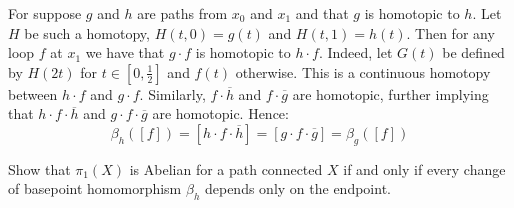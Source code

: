\documentclass{book}                                                           %
\begin{document}
        \begin{solution}
            For suppose $g$ and $h$ are paths from $x_{0}$ and $x_{1}$ and that $g$
            is homotopic to $h$. Let $H$ be such a homotopy, $H(t,0)=g(t)$ and
            $H(t,1)=h(t)$. Then for any loop $f$ at $x_{1}$ we have that $g\cdot{f}$
            is homotopic to $h\cdot{f}$. Indeed, let $G(t)$ be defined by $H(2t)$
            for $t\in[0,\frac{1}{2}]$ and $f(t)$ otherwise. This is a continuous
            homotopy between $h\cdot{f}$ and
            $g\cdot{f}$. Similarly, $f\cdot\overline{h}$ and $f\cdot\overline{g}$
            are homotopic, further implying that $h\cdot{f}\cdot\overline{h}$ and
            $g\cdot{f}\cdot\overline{g}$ are homotopic. Hence:
            \begin{equation}
                \beta_{h}([f])=[h\cdot{f}\cdot\overline{h}]
                    =[g\cdot{f}\cdot\overline{g}]=\beta_{g}([f])
            \end{equation}
        \end{solution}
        \begin{problem}
            Show that $\pi_{1}(X)$ is Abelian for a path connected $X$ if and only
            if every change of basepoint homomorphism $\beta_{h}$ depends only on
            the endpoint.
        \end{problem}
\end{document}
